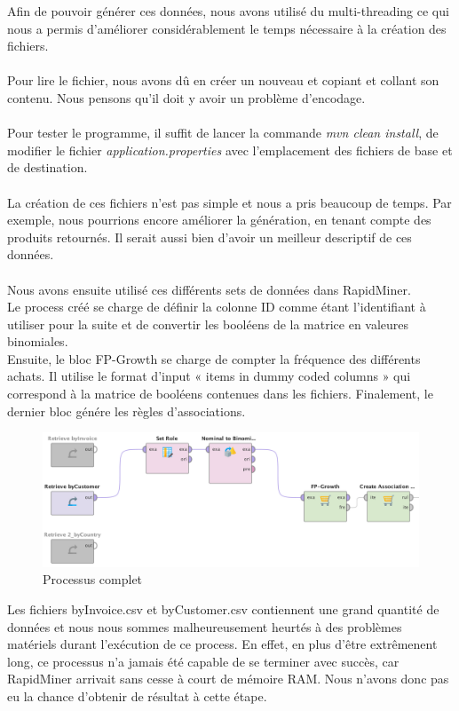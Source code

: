 \documentclass[a4paper]{article}
\begin{document}
Afin de pouvoir générer ces données, nous avons utilisé du multi-threading ce qui nous a permis d'améliorer considérablement le temps nécessaire à la création des fichiers.
\\\\
Pour lire le fichier, nous avons dû en créer un nouveau et copiant et collant son contenu. Nous pensons qu'il doit y avoir un problème d'encodage. 
\\\\
Pour tester le programme, il suffit de lancer la commande \textit{mvn clean install}, de modifier le fichier \textit{application.properties} avec l'emplacement des fichiers de base et de destination.
\\\\
La création de ces fichiers n'est pas simple et nous a pris beaucoup de temps. Par exemple, nous pourrions encore améliorer la génération, en tenant compte des produits retournés.
Il serait aussi bien d'avoir un meilleur descriptif de ces données.
\\\\
Nous avons ensuite utilisé ces différents sets de données dans RapidMiner.
\\
Le process créé se charge de définir la colonne ID comme étant l'identifiant à utiliser pour la suite et de convertir les booléens de la matrice en valeures binomiales.
\\
Ensuite, le bloc FP-Growth se charge de compter la fréquence des différents achats. Il utilise le format d'input « items in dummy coded columns » qui correspond à la matrice de booléens contenues dans les fichiers.
Finalement, le dernier bloc génére les règles d'associations.

\begin{figure}[H]
	\includegraphics[width=\linewidth]{imgs/part_2/2_full_process}
	\caption{Processus complet}
	\label{fig:2_full_process}
\end{figure}

Les fichiers byInvoice.csv et byCustomer.csv contiennent une grand quantité de données et nous nous sommes malheureusement heurtés à des problèmes matériels durant l'exécution de ce process.
En effet, en plus d'être extrêmenent long, ce processus n'a jamais été capable de se terminer avec succès, car RapidMiner arrivait sans cesse à court de mémoire RAM.
Nous n'avons donc pas eu la chance d'obtenir de résultat à cette étape.
\end{document}
